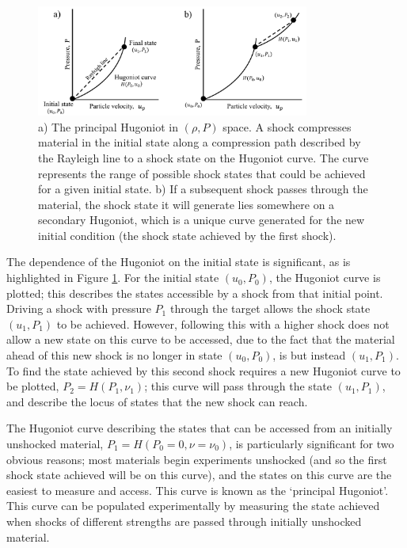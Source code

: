 \begin{figure}
\centering
\includegraphics[width=0.8\textwidth]{figures/Theory/SecondaryHugoniot.pdf}%
\caption{\label{fig:SecondaryHugoniot} a) The principal Hugoniot in $(\rho, P)$ space. A shock compresses material in the initial state along a compression path described by the Rayleigh line to a shock state on the Hugoniot curve. The curve represents the range of possible shock states that could be achieved for a given initial state. b) If a subsequent shock passes through the material, the shock state it will generate lies somewhere on a secondary Hugoniot, which is a unique curve generated for the new initial condition (the shock state achieved by the first shock).}
\end{figure}

The dependence of the Hugoniot on the initial state is significant, as is highlighted in Figure \ref{fig:SecondaryHugoniot}. For the initial state $(u_0, P_0)$, the Hugoniot curve is plotted; this describes the states accessible by a shock from that initial point. Driving a shock with pressure $P_1$ through the target allows the shock state $(u_1, P_1)$ to be achieved. However, following this with a higher shock does not allow a new state on this curve to be accessed, due to the fact that the material ahead of this new shock is no longer in state $(u_0, P_0)$, is but instead $(u_1, P_1)$. To find the state achieved by this second shock requires a new Hugoniot curve to be plotted, $P_2 = H(P_1, \nu_1)$; this curve will pass through the state $(u_1, P_1)$, and describe the locus of states that the new shock can reach.

The Hugoniot curve describing the states that can be accessed from an initially unshocked material, $P_1 = H(P_0 = 0, \nu=\nu_0)$, is particularly significant for two obvious reasons; most materials begin experiments unshocked (and so the first shock state achieved will be on this curve), and the states on this curve are the easiest to measure and access. This curve is known as the `principal Hugoniot'. This curve can be populated experimentally by measuring the state achieved when shocks of different strengths are passed through initially unshocked material.


